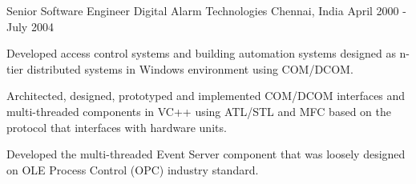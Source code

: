 \begin{cventries}
\cventry
{Senior Software Engineer} %
{Digital Alarm Technologies} %
{Chennai, India} %
{April 2000 - July 2004} %
{
	\begin{cvitems} %
		\item {Developed access control systems and building automation systems designed as n-tier distributed systems in Windows environment using COM/DCOM.}
		\item {Architected, designed, prototyped and implemented COM/DCOM interfaces and multi-threaded components in VC++ using ATL/STL and MFC based on the protocol that interfaces with hardware units. }
		\item {Developed the multi-threaded Event Server component that was loosely designed on OLE Process Control (OPC) industry standard. }
	\end{cvitems}
}


\end{cventries}

